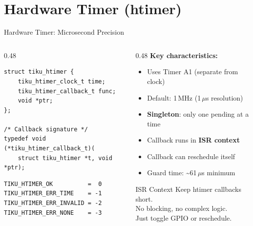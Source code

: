 \documentclass[aspectratio=169, 10pt]{beamer}
\begin{document}
\section{Hardware Timer (htimer)}

\begin{frame}[fragile]{Hardware Timer: Microsecond Precision}
\begin{columns}[T]
\begin{column}{0.48\textwidth}
\begin{lstlisting}[style=cstyle,
  title={kernel/timers/tiku\_htimer.h}]
struct tiku_htimer {
    tiku_htimer_clock_t time;
    tiku_htimer_callback_t func;
    void *ptr;
};

/* Callback signature */
typedef void (*tiku_htimer_callback_t)(
    struct tiku_htimer *t, void *ptr);
\end{lstlisting}

\begin{lstlisting}[style=cstyle, title={Status codes}]
TIKU_HTIMER_OK          =  0
TIKU_HTIMER_ERR_TIME    = -1
TIKU_HTIMER_ERR_INVALID = -2
TIKU_HTIMER_ERR_NONE    = -3
\end{lstlisting}
\end{column}

\begin{column}{0.48\textwidth}
\textbf{Key characteristics:}
\begin{itemize}
  \item Uses Timer A1 (separate from clock)
  \item Default: 1\,MHz (1\,$\mu$s resolution)
  \item \textbf{Singleton}: only one pending at a time
  \item Callback runs in \textbf{ISR context}
  \item Callback can reschedule itself
  \item Guard time: \textasciitilde61\,$\mu$s minimum
\end{itemize}

\vspace{0.3em}
\begin{alertblock}{ISR Context}
Keep htimer callbacks short.\\
No blocking, no complex logic.\\
Just toggle GPIO or reschedule.
\end{alertblock}
\end{column}
\end{columns}
\end{frame}
\end{document}
